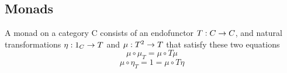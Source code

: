 \documentclass[../../notes.tex]{subfiles}
\begin{document}
\subsection{Monads}

\begin{definition}

  A monad on a category C consists of an endofunctor $ T : C \rightarrow C $,
  and natural transformations $\eta : 1_C \rightarrow T$ and $\mu : T^2 \rightarrow T$
  that satisfy these two equations
  \[ \mu \circ \mu_T = \mu \circ T\mu \]
  \[ \mu \circ \eta_T = 1 = \mu \circ T\eta \]
\end{definition}
\end{document}
